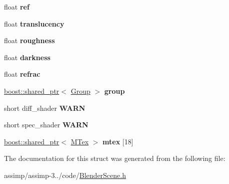 \begin{DoxyCompactItemize}
\item 
\hypertarget{struct_assimp_1_1_blender_1_1_material_a8111d1f4f11711ab9408e8b9d84d9d6f}{float {\bfseries ref}}\label{struct_assimp_1_1_blender_1_1_material_a8111d1f4f11711ab9408e8b9d84d9d6f}

\item 
\hypertarget{struct_assimp_1_1_blender_1_1_material_a743023137e1bf6cfdbb47e58cd7de03a}{float {\bfseries translucency}}\label{struct_assimp_1_1_blender_1_1_material_a743023137e1bf6cfdbb47e58cd7de03a}

\item 
\hypertarget{struct_assimp_1_1_blender_1_1_material_ab403e3a73ae521c40492fb14776bc571}{float {\bfseries roughness}}\label{struct_assimp_1_1_blender_1_1_material_ab403e3a73ae521c40492fb14776bc571}

\item 
\hypertarget{struct_assimp_1_1_blender_1_1_material_a359a77d77283020dcffc7c5557dd3dd4}{float {\bfseries darkness}}\label{struct_assimp_1_1_blender_1_1_material_a359a77d77283020dcffc7c5557dd3dd4}

\item 
\hypertarget{struct_assimp_1_1_blender_1_1_material_a4adf6e27c6738304b82d951858bc968b}{float {\bfseries refrac}}\label{struct_assimp_1_1_blender_1_1_material_a4adf6e27c6738304b82d951858bc968b}

\item 
\hypertarget{struct_assimp_1_1_blender_1_1_material_a55a08ecc2d2f2acb9b4dd48ce9e77247}{\hyperlink{classboost_1_1shared__ptr}{boost\+::shared\+\_\+ptr}$<$ \hyperlink{struct_assimp_1_1_blender_1_1_group}{Group} $>$ {\bfseries group}}\label{struct_assimp_1_1_blender_1_1_material_a55a08ecc2d2f2acb9b4dd48ce9e77247}

\item 
\hypertarget{struct_assimp_1_1_blender_1_1_material_a0d4cad0ad98d317ef596aea30aff7a18}{short diff\+\_\+shader {\bfseries W\+A\+R\+N}}\label{struct_assimp_1_1_blender_1_1_material_a0d4cad0ad98d317ef596aea30aff7a18}

\item 
\hypertarget{struct_assimp_1_1_blender_1_1_material_a03bc7f5119c667bac6de16088e99ac04}{short spec\+\_\+shader {\bfseries W\+A\+R\+N}}\label{struct_assimp_1_1_blender_1_1_material_a03bc7f5119c667bac6de16088e99ac04}

\item 
\hypertarget{struct_assimp_1_1_blender_1_1_material_ab63fa120f8611f194f3493bc84e12f3d}{\hyperlink{classboost_1_1shared__ptr}{boost\+::shared\+\_\+ptr}$<$ \hyperlink{struct_assimp_1_1_blender_1_1_m_tex}{M\+Tex} $>$ {\bfseries mtex} \mbox{[}18\mbox{]}}\label{struct_assimp_1_1_blender_1_1_material_ab63fa120f8611f194f3493bc84e12f3d}

\end{DoxyCompactItemize}


The documentation for this struct was generated from the following file\+:\begin{DoxyCompactItemize}
\item 
assimp/assimp-\/3../code/\hyperlink{_blender_scene_8h}{Blender\+Scene.\+h}\end{DoxyCompactItemize}
